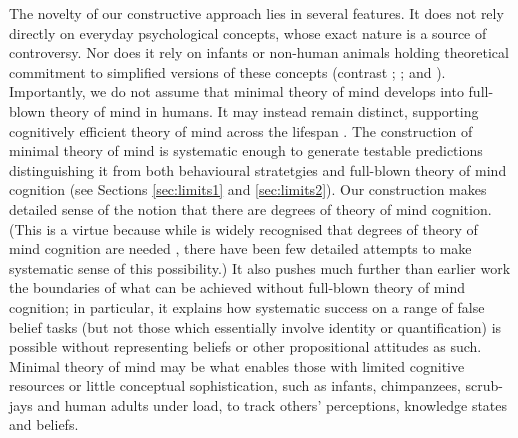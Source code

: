 \documentclass[12pt,\papersize]{extarticle}
\begin{document}
The novelty of our constructive approach lies in several features.  It does not rely directly on everyday psychological concepts, whose exact nature is a source of controversy.
Nor does it rely on infants or non-human animals holding theoretical commitment to simplified versions of these concepts (contrast 
	\citealp{en_75};
	\citealp{en_81};
	\citealp{en_2372} and
	\citealp{en_1614}%
).
Importantly, we do not assume that minimal theory of mind develops into full-blown theory of mind in humans.  
It may instead remain distinct, supporting cognitively efficient theory of mind across the lifespan \citep[see][]{Samson:2010jm, en_2397}.  The construction of minimal theory of mind is systematic enough to generate testable predictions distinguishing it from both behavioural stratetgies and full-blown theory of mind cognition (see Sections \ref{sec:limits1} and \ref{sec:limits2}).  
Our construction makes detailed sense of the notion that there are degrees of theory of mind cognition.  
(This is a virtue because while is widely recognised that degrees of theory of mind cognition are needed \citep[e.g.][]{en_610, en_1415}, there have been few detailed attempts to make systematic sense of this possibility.)
It also pushes much further than earlier work the boundaries of what can be achieved without full-blown theory of mind cognition; in particular, it explains how systematic success on a range of false belief tasks (but not those which essentially involve identity or quantification) is possible without representing beliefs or other propositional attitudes as such. Minimal theory of mind may be what enables those with limited cognitive resources or little conceptual sophistication, such as infants, chimpanzees, scrub-jays and human adults under load,  to track others'  perceptions, knowledge states and beliefs. 


















\small

\end{document}
